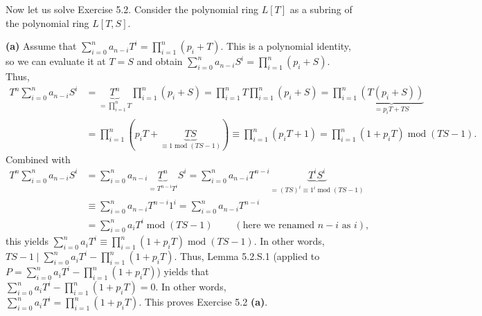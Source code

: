 \documentclass[numbers=enddot,12pt,final,onecolumn,notitlepage]{scrartcl}%
\begin{document}
Now let us solve Exercise 5.2. Consider the polynomial ring $L\left[
T\right]  $ as a subring of the polynomial ring $L\left[  T,S\right]  $.

\textbf{(a)} Assume that $\sum\limits_{i=0}^{n}a_{n-i}T^{i}=\prod
\limits_{i=1}^{n}\left(  p_{i}+T\right)  $. This is a polynomial identity, so
we can evaluate it at $T=S$ and obtain $\sum\limits_{i=0}^{n}a_{n-i}%
S^{i}=\prod\limits_{i=1}^{n}\left(  p_{i}+S\right)  $. Thus,%
\begin{align*}
T^{n}\sum\limits_{i=0}^{n}a_{n-i}S^{i}  &  =\underbrace{T^{n}}_{=\prod
\limits_{i=1}^{n}T}\prod\limits_{i=1}^{n}\left(  p_{i}+S\right)
=\prod\limits_{i=1}^{n}T\prod\limits_{i=1}^{n}\left(  p_{i}+S\right)
=\prod\limits_{i=1}^{n}\underbrace{\left(  T\left(  p_{i}+S\right)  \right)
}_{=p_{i}T+TS}\\
&  =\prod\limits_{i=1}^{n}\left(  p_{i}T+\underbrace{TS}_{\equiv
1\operatorname{mod}\left(  TS-1\right)  }\right)  \equiv\prod\limits_{i=1}%
^{n}\left(  p_{i}T+1\right)  =\prod\limits_{i=1}^{n}\left(  1+p_{i}T\right)
\operatorname{mod}\left(  TS-1\right)  .
\end{align*}
Combined with%
\begin{align*}
T^{n}\sum\limits_{i=0}^{n}a_{n-i}S^{i}  &  =\sum\limits_{i=0}^{n}%
a_{n-i}\underbrace{T^{n}}_{=T^{n-i}T^{i}}S^{i}=\sum\limits_{i=0}^{n}%
a_{n-i}T^{n-i}\underbrace{T^{i}S^{i}}_{=\left(  TS\right)  ^{i}\equiv
1^{i}\operatorname{mod}\left(  TS-1\right)  }\\
&  \equiv\sum\limits_{i=0}^{n}a_{n-i}T^{n-i}1^{i}=\sum\limits_{i=0}^{n}%
a_{n-i}T^{n-i}\\
&  =\sum\limits_{i=0}^{n}a_{i}T^{i}\operatorname{mod}\left(  TS-1\right)
\ \ \ \ \ \ \ \ \ \ \left(  \text{here we renamed }n-i\text{ as }i\right)  ,
\end{align*}
this yields $\sum\limits_{i=0}^{n}a_{i}T^{i}\equiv\prod\limits_{i=1}%
^{n}\left(  1+p_{i}T\right)  \operatorname{mod}\left(  TS-1\right)  $. In
other words, $TS-1\mid\sum\limits_{i=0}^{n}a_{i}T^{i}-\prod\limits_{i=1}%
^{n}\left(  1+p_{i}T\right)  $. Thus, Lemma 5.2.S.1 (applied to $P=\sum
\limits_{i=0}^{n}a_{i}T^{i}-\prod\limits_{i=1}^{n}\left(  1+p_{i}T\right)  $)
yields that $\sum\limits_{i=0}^{n}a_{i}T^{i}-\prod\limits_{i=1}^{n}\left(
1+p_{i}T\right)  =0$. In other words, $\sum\limits_{i=0}^{n}a_{i}T^{i}%
=\prod\limits_{i=1}^{n}\left(  1+p_{i}T\right)  $. This proves Exercise 5.2
\textbf{(a)}.
\end{document}
